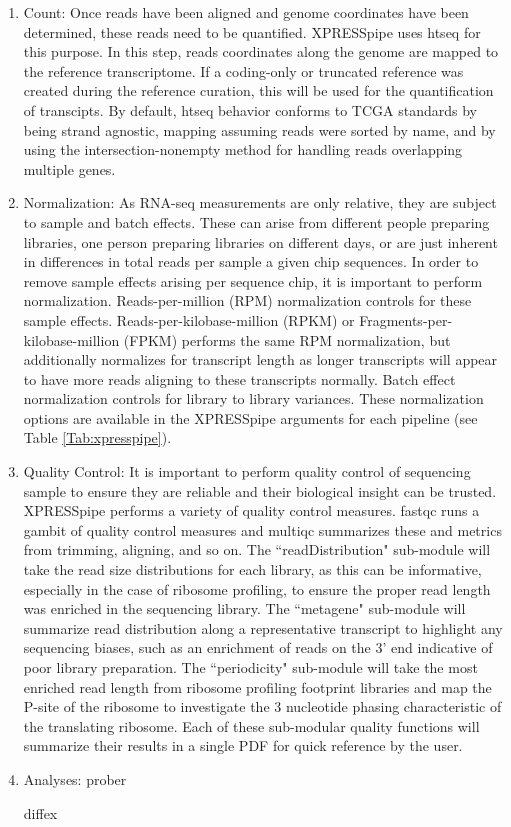\documentclass[11pt, a4paper, oneside]{article}
\begin{document}
\begin{enumerate}
  \item Count: Once reads have been aligned and genome coordinates have been determined, these reads need to be quantified. XPRESSpipe uses htseq{} for this purpose. In this step, reads coordinates along the genome are mapped to the reference transcriptome. If a coding-only or truncated reference was created during the reference curation, this will be used for the quantification of transcipts. By default, htseq behavior conforms to TCGA standards by being strand agnostic, mapping assuming reads were sorted by name, and by using the intersection-nonempty method for handling reads overlapping multiple genes.
  \item Normalization: As RNA-seq measurements are only relative, they are subject to sample and batch effects. These can arise from different people preparing libraries, one person preparing libraries on different days, or are just inherent in differences in total reads per sample a given chip sequences. In order to remove sample effects arising per sequence chip, it is important to perform normalization. Reads-per-million (RPM) normalization controls for these sample effects. Reads-per-kilobase-million (RPKM) or Fragments-per-kilobase-million (FPKM) performs the same RPM normalization, but additionally normalizes for transcript length as longer transcripts will appear to have more reads aligning to these transcripts normally. Batch effect normalization controls for library to library variances. These normalization options are available in the XPRESSpipe arguments for each pipeline (see Table \ref{Tab:xpresspipe}).
  \item Quality Control: It is important to perform quality control of sequencing sample to ensure they are reliable and their biological insight can be trusted. XPRESSpipe performs a variety of quality control measures. fastqc{} runs a gambit of quality control measures and multiqc summarizes these and metrics from trimming, aligning, and so on. The ``readDistribution" sub-module will take the read size distributions for each library, as this can be informative, especially in the case of ribosome profiling, to ensure the proper read length was enriched in the sequencing library. The ``metagene" sub-module will summarize read distribution along a representative transcript to highlight any sequencing biases, such as an enrichment of reads on the 3' end indicative of poor library preparation. The ``periodicity" sub-module will take the most enriched read length from ribosome profiling footprint libraries and map the P-site of the ribosome to investigate the 3 nucleotide phasing characteristic of the translating ribosome. Each of these sub-modular quality functions will summarize their results in a single PDF for quick reference by the user.
  \item Analyses:
        prober

        diffex

\end{enumerate}
\end{document}
